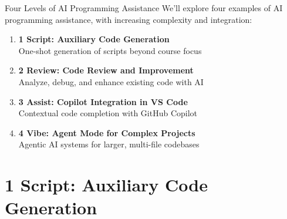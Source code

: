 \documentclass[xcolor=dvipsnames, aspectratio=169]{beamer}
\begin{document}
\begin{frame}{Four Levels of AI Programming Assistance}
  We'll explore four examples of AI programming assistance, with increasing complexity and integration:
  
  \begin{enumerate}
    \item \textbf{1 Script: Auxiliary Code Generation}\\
    One-shot generation of scripts beyond course focus
    
    \item \textbf{2 Review: Code Review and Improvement}\\
    Analyze, debug, and enhance existing code with AI
    
    \item \textbf{3 Assist: Copilot Integration in VS Code}\\
    Contextual code completion with GitHub Copilot
    
    \item \textbf{4 Vibe: Agent Mode for Complex Projects}\\
    Agentic AI systems for larger, multi-file codebases
  \end{enumerate}
\end{frame}

\section{1 Script: Auxiliary Code Generation}
\end{document}
